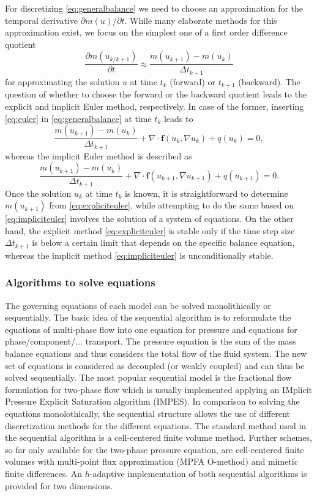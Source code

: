 For discretizing \eqref{eq:generalbalance} we need to choose an
approximation for the temporal derivative $\partial m(u)/\partial t$.
While many elaborate methods for this approximation exist,
we focus on the simplest one of a first order difference quotient
\begin{equation}\label{eq:euler}
\frac{\partial m(u_{k/k+1})}{\partial t}
\approx \frac{m(u_{k+1}) - m(u_k)}{\Delta t_{k+1}}
\end{equation}
for approximating the solution $u$ at time $t_k$ (forward) or $t_{k+1}$ (backward).
The question of whether to choose the forward or the backward quotient leads to the
explicit and implicit Euler method, respectively.
In case of the former, inserting \eqref{eq:euler} in \eqref{eq:generalbalance}
at time $t_k$ leads to
\begin{equation}\label{eq:expliciteuler}
\frac{m(u_{k+1}) - m(u_k)}{\Delta t_{k+1}} + \nabla\cdot\mathbf{f}(u_k, \nabla u_k) + q(u_k) = 0,
\end{equation}
whereas the implicit Euler method is described as
\begin{equation}\label{eq:impliciteuler}
\frac{m(u_{k+1}) - m(u_k)}{\Delta t_{k+1}}
+ \nabla\cdot\mathbf{f}(u_{k+1}, \nabla u_{k+1}) + q(u_{k+1}) = 0.
\end{equation}
Once the solution $u_k$ at time $t_k$ is known, it is straightforward
to determine $m(u_{k+1})$ from \eqref{eq:expliciteuler},
while attempting to do the same based on \eqref{eq:impliciteuler}
involves the solution of a system of equations.
On the other hand, the explicit method \eqref{eq:expliciteuler} is stable only
if the time step size $\Delta t_{k+1}$ is below a certain limit that depends
on the specific balance equation, whereas the implicit method \eqref{eq:impliciteuler}
is unconditionally stable.

\subsubsection{Algorithms to solve equations}
The governing equations of each model can be solved monolithically or sequentially.
The basic idea of the sequential algorithm is to reformulate the
equations of multi-phase flow into one equation for
pressure and equations for phase/component/... transport. The pressure equation
is the sum of the mass balance equations and thus considers the total flow of the
fluid system. The new set of equations is considered as decoupled (or weakly coupled)
and can thus be solved sequentially. The most popular sequential model is the
fractional flow formulation for two-phase flow which is usually implemented applying
an IMplicit Pressure Explicit Saturation algorithm (IMPES).
In comparison to solving the equations monolothically, the sequential structure allows the use of
different discretization methods for the different equations. The standard method
used in the sequential algorithm is a cell-centered finite volume method. Further schemes,
so far only available for the two-phase pressure equation, are cell-centered finite
volumes with multi-point flux approximation (MPFA O-method) and mimetic finite differences.
An $h$-adaptive implementation of both sequential algorithms is provided for two dimensions.
